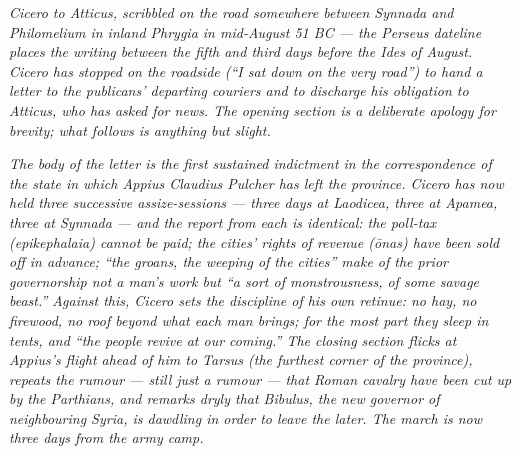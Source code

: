 
\textit{Cicero to Atticus, scribbled on the road somewhere between
Synnada and Philomelium in inland Phrygia in mid-August 51 BC ---
the Perseus dateline places the writing between the fifth and
third days before the Ides of August. Cicero has stopped on the
roadside (``I sat down on the very road'') to hand a letter to the
publicans' departing couriers and to discharge his obligation
to Atticus, who has asked for news. The opening section is a
deliberate apology for brevity; what follows is anything but
slight.}

\textit{The body of the letter is the first sustained indictment
in the correspondence of the state in which Appius Claudius
Pulcher has left the province. Cicero has now held three
successive assize-sessions --- three days at Laodicea, three at
Apamea, three at Synnada --- and the report from each is
identical: the poll-tax \textit{(epikephalaia)} cannot be paid;
the cities' rights of revenue \textit{(\=onas)} have been sold off
in advance; ``the groans, the weeping of the cities'' make of
the prior governorship not a man's work but ``a sort of
monstrousness, of some savage beast.'' Against this, Cicero
sets the discipline of his own retinue: no hay, no firewood, no
roof beyond what each man brings; for the most part they sleep
in tents, and ``the people revive at our coming.'' The closing
section flicks at Appius's flight ahead of him to Tarsus (the
furthest corner of the province), repeats the rumour --- still
just a rumour --- that Roman cavalry have been cut up by the
Parthians, and remarks dryly that Bibulus, the new governor of
neighbouring Syria, is dawdling in order to leave the later.
The march is now three days from the army camp.}

